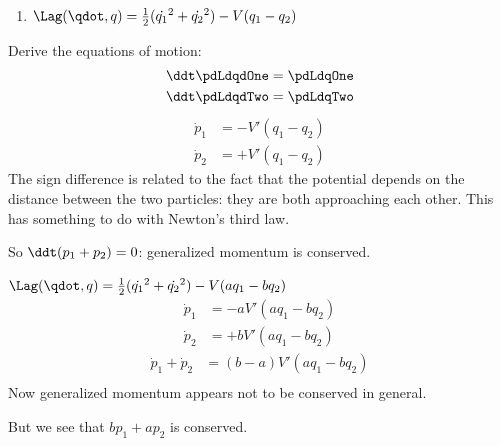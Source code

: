 \begin{enumerate}
\item $\Lag(\qdot, q) = \frac{1}{2}(\dot{q_1}^2 + \dot{q_2}^2) - V(q_1 - q_2)$
\end{enumerate}
Derive the equations of motion:
\begin{align*}
  \ddt \pdLdqdOne &= \pdLdqOne \\
  \ddt \pdLdqdTwo &= \pdLdqTwo \\
\end{align*}
\begin{align*}
  \dot{p}_1        &= -V'(q_1 - q_2) \\
  \dot{p}_2        &= +V'(q_1 - q_2)
\end{align*}
The sign difference is related to the fact that the potential depends on the distance between the two
particles: they are both approaching each other. This has something to do with Newton's third law.

So $\ddt(p_1 + p_2) = 0$: generalized momentum is conserved.

\item $\Lag(\qdot, q) = \frac{1}{2}(\dot{q_1}^2 + \dot{q_2}^2) - V(aq_1 - bq_2)$
\begin{align*}
  \dot{p}_1        &= -aV'(aq_1 - bq_2) \\
  \dot{p}_2        &= +bV'(aq_1 - bq_2)
\end{align*}
\begin{align*}
  \dot{p}_1 + \dot{p}_2 &= (b-a)V'(aq_1 - bq_2) \\
\end{align*}
Now generalized momentum appears not to be conserved in general.

But we see that $bp_1 + ap_2$ is conserved.
